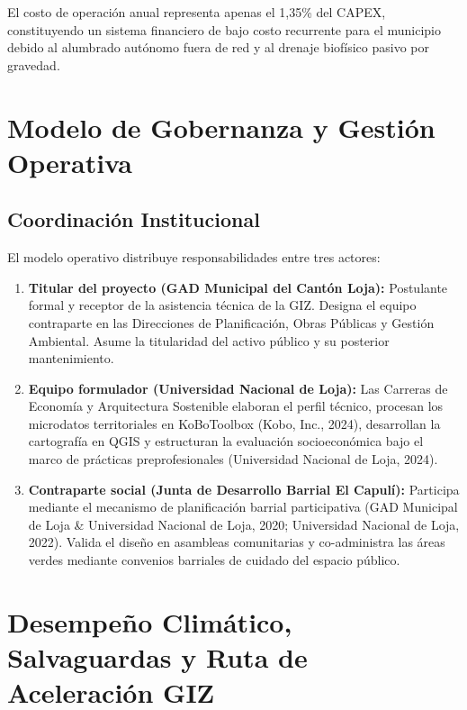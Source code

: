 \documentclass[
  spanish,
  letterpaper,
  DIV=11,
  numbers=noendperiod]{scrartcl}
\begin{document}
El costo de operación anual representa apenas el 1,35\% del CAPEX,
constituyendo un sistema financiero de bajo costo recurrente para el
municipio debido al alumbrado autónomo fuera de red y al drenaje
biofísico pasivo por gravedad.

\section{Modelo de Gobernanza y Gestión
Operativa}\label{modelo-de-gobernanza-y-gestiuxf3n-operativa}

\subsection{Coordinación
Institucional}\label{coordinaciuxf3n-institucional}

El modelo operativo distribuye responsabilidades entre tres actores:

\begin{enumerate}
\def\labelenumi{\arabic{enumi}.}
\item
  \textbf{Titular del proyecto (GAD Municipal del Cantón Loja):}
  Postulante formal y receptor de la asistencia técnica de la GIZ.
  Designa el equipo contraparte en las Direcciones de Planificación,
  Obras Públicas y Gestión Ambiental. Asume la titularidad del activo
  público y su posterior mantenimiento.
\item
  \textbf{Equipo formulador (Universidad Nacional de Loja):} Las
  Carreras de Economía y Arquitectura Sostenible elaboran el perfil
  técnico, procesan los microdatos territoriales en KoBoToolbox (Kobo,
  Inc., 2024), desarrollan la cartografía en QGIS y estructuran la
  evaluación socioeconómica bajo el marco de prácticas preprofesionales
  (Universidad Nacional de Loja, 2024).
\item
  \textbf{Contraparte social (Junta de Desarrollo Barrial El Capulí):}
  Participa mediante el mecanismo de planificación barrial participativa
  (GAD Municipal de Loja \& Universidad Nacional de Loja, 2020;
  Universidad Nacional de Loja, 2022). Valida el diseño en asambleas
  comunitarias y co-administra las áreas verdes mediante convenios
  barriales de cuidado del espacio público.
\end{enumerate}

\section{Desempeño Climático, Salvaguardas y Ruta de Aceleración
GIZ}\label{desempeuxf1o-climuxe1tico-salvaguardas-y-ruta-de-aceleraciuxf3n-giz}
\end{document}
